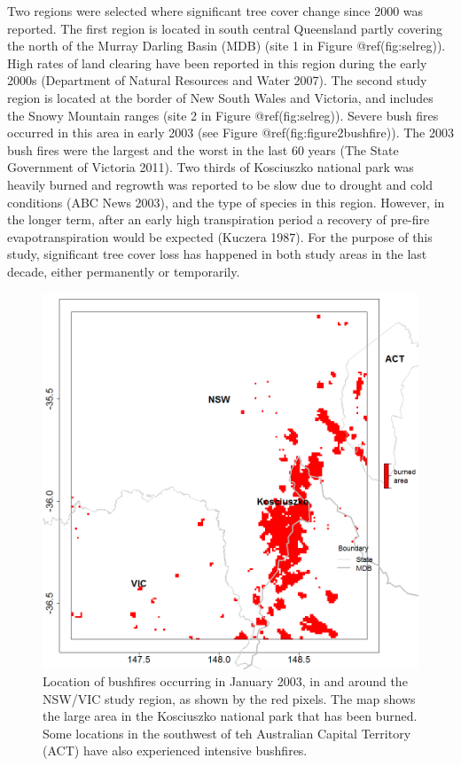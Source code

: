 \documentclass[fleqn,10pt,lineno]{wlpeerj} %
\begin{document}
Two regions were selected where significant tree cover change since 2000
was reported. The first region is located in south central Queensland
partly covering the north of the Murray Darling Basin (MDB) (site 1 in
Figure @ref(fig:selreg)). High rates of land clearing have been reported
in this region during the early 2000s (Department of Natural Resources
and Water 2007). The second study region is located at the border of New
South Wales and Victoria, and includes the Snowy Mountain ranges (site 2
in Figure @ref(fig:selreg)). Severe bush fires occurred in this area in
early 2003 (see Figure @ref(fig:figure2bushfire)). The 2003 bush fires
were the largest and the worst in the last 60 years (The State
Government of Victoria 2011). Two thirds of Kosciuszko national park was
heavily burned and regrowth was reported to be slow due to drought and
cold conditions (ABC News 2003), and the type of species in this region.
However, in the longer term, after an early high transpiration period a
recovery of pre-fire evapotranspiration would be expected (Kuczera
1987). For the purpose of this study, significant tree cover loss has
happened in both study areas in the last decade, either permanently or
temporarily.

\begin{figure}
\includegraphics[width=0.9\linewidth]{figures/bushfire_nswvic} \caption{Location of bushfires occurring in January 2003, in and around the NSW/VIC study region, as shown by the red pixels. The map shows the large area in the Kosciuszko national park that has been burned. Some locations in the southwest of teh Australian Capital Territory (ACT) have also experienced intensive bushfires.}\label{fig:figure2bushfire}
\end{figure}
\end{document}
